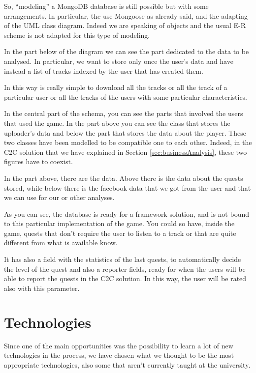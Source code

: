 So, ``modeling'' a MongoDB database is still possible but with some arrangements. In particular, the use Mongoose as already said, and the adapting of the UML class diagram. Indeed we are speaking of objects and the usual E-R scheme is not adapted for this type of modeling.

In the part below of the diagram we can see the part dedicated to the data to be analysed. In particular, we want to store only once the user's data and have instead a list of tracks indexed by the user that has created them.

In this way is really simple to download all the tracks or all the track of a particular user or all the tracks of the users with some particular characteristics.

In the central part of the schema, you can see the parts that involved the users that used the game. In the part above you can see the class that stores the uploader's data and below the part that stores the data about the player. These two classes have been modelled to be compatible one to each other. Indeed, in the C2C solution that we have explained in Section \ref{sec:businessAnalysis}, these two figures have to coexist.

In the part above, there are the data. Above there is the data about the quests stored, while below there is the facebook data that we got from the user and that we can use for our or other analyses.

As you can see, the database is ready for a framework solution, and is not bound to this particular implementation of the game. You could so have, inside the game, quests that don't require the user to listen to a track or that are quite different from what is available know. 

It has also a field with the statistics of the last quests, to automatically decide the level of the quest and also a reporter fields, ready for when the users will be able to report the quests in the C2C solution. In this way, the user will be rated also with this parameter.

\newpage

\section{Technologies}
\label{sec:technologies}
Since one of the main opportunities was the possibility to learn a lot of new technologies in the process, we have chosen what we thought to be the most appropriate technologies, also some that aren't currently taught at the university.
 
